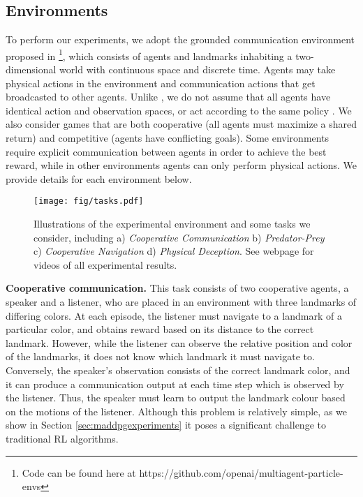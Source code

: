 \documentclass{article}
\newcommand{\insertfigure}[3]{
\begin{figure}[ht]
\centering
\texttt{[image: fig/\#1]}
\caption{#3}
\label{fig:#1}
\end{figure}
}
\newcommand{\hide}[1]{}
\begin{document}
\subsection{Environments}
\label{sec:environments}
To perform our experiments, we adopt the grounded communication environment proposed in \cite{mordatch2017emergence}\footnote{Code can be found here at https://github.com/openai/multiagent-particle-envs}, which consists of  agents and  landmarks inhabiting a two-dimensional world with continuous space and discrete time. Agents may take physical actions in the environment and communication actions that get broadcasted to other agents. Unlike  \cite{mordatch2017emergence}, we do not assume that all agents have identical action and observation spaces, or act according to the same policy . We also consider games that are both cooperative (all agents must maximize a shared return) and competitive (agents have conflicting goals). Some environments require explicit communication between agents in order to achieve the best reward, while in other environments agents can only perform physical actions. We provide details for each environment below.


\hide{
\insertfigure{tasks}{1.00}{Illustrations of the experimental environment and some tasks we consider, including a) \emph{Cooperative Communication} b) \emph{Predator-Prey} c) \emph{Cooperative Navigation} d) \emph{Physical Deception}. See webpage for videos of all experimental results.}
}

\begin{figure}[ht]
\centering
\texttt{[image: fig/tasks.pdf]}
\caption{Illustrations of the experimental environment and some tasks we consider, including a) \emph{Cooperative Communication} b) \emph{Predator-Prey} c) \emph{Cooperative Navigation} d) \emph{Physical Deception}. See webpage for videos of all experimental results.\vspace{-2mm}}
\label{fig:tasks}
\end{figure}






\textbf{Cooperative communication.} This task consists of two cooperative agents, a speaker and a listener, who are placed in an environment with three landmarks of differing colors. At each episode, the listener must navigate to a landmark of a particular color, and obtains reward based on its distance to the correct landmark. However, while the listener can observe the relative position and color of the landmarks, it does not know which landmark it must navigate to. Conversely, the speaker's observation consists of the correct landmark color, and it can produce a communication output at each time step which is observed by the listener. Thus, the speaker must learn to output the landmark colour based on the motions of the listener. 
Although this problem is relatively simple, as we show in Section \ref{sec:maddpgexperiments} it poses a significant challenge to traditional RL algorithms.
\end{document}
